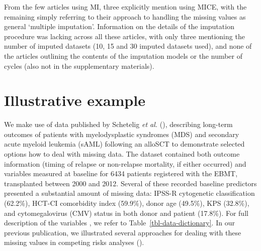 \documentclass[
  letterpaper,
  paper=240mm:170mm,
  twoside=true,
  open=right,
  fontsize=10pt,
  pagesize=false,
  BCOR=15mm,
  DIV=14,
  headinclude=true,
  footinclude=false,
  headsepline=on]{scrbook}
\begin{document}
From the few articles using MI, three explicitly mention using MICE,
with the remaining simply referring to their approach to handling the
missing values as general `multiple imputation'. Information on the
details of the imputation procedure was lacking across all these
articles, with only three mentioning the number of imputed datasets (10,
15 and 30 imputed datasets used), and none of the articles outlining the
contents of the imputation models or the number of cycles (also not in
the supplementary materials).

\section{Illustrative example}\label{illustrative-example}

We make use of data published by Schetelig \emph{et al.}
(),
describing long-term outcomes of patients with myelodysplastic syndromes
(MDS) and secondary acute myeloid leukemia (sAML) following an alloSCT
to demonstrate selected options how to deal with missing data. The
dataset contained both outcome information (timing of relapse or
non-relapse mortality, if either occurred) and variables measured at
baseline for 6434 patients registered with the EBMT, transplanted
between 2000 and 2012. Several of these recorded baseline predictors
presented a substantial amount of missing data: IPSS-R cytogenetic
classification (62.2\%), HCT-CI comorbidity index (59.9\%), donor age
(49.5\%), KPS (32.8\%), and cytomegalovirus (CMV) status in both donor
and patient (17.8\%). For full description of the variables , we refer
to Table~\ref{tbl-data-dictionary}. In our previous publication, we
illustrated several approaches for dealing with these missing values in
competing risks analyses
().

\begingroup\fontsize{7}{9}\selectfont
\end{document}
